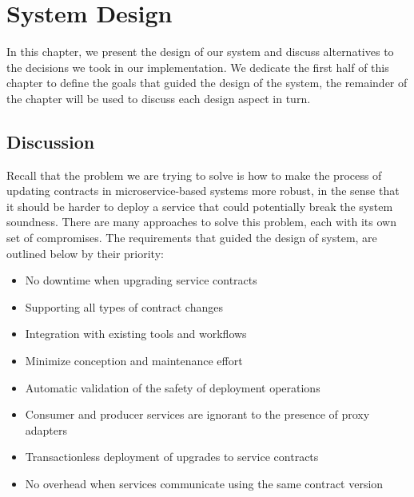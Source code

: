 
%

\chapter{System Design}
\label{cha:design}

In this chapter, we present the design of our system and discuss alternatives to the decisions we took in our implementation.
We dedicate the first half of this chapter to define the goals that guided the design of the system,
the remainder of the chapter will be used to discuss each design aspect in turn.

\section{Discussion} %
\label{sec:discussion}

Recall that the problem we are trying to solve is how to make the process of updating contracts in
microservice-based systems more robust, in the sense that it should be harder to deploy a service that could
potentially break the system soundness.
There are many approaches to solve this problem, each with its own set of compromises.
The requirements that guided the design of system, are outlined below by their priority:

\begin{itemize}
    \item No downtime when upgrading service contracts
    \item Supporting all types of contract changes
    \item Integration with existing tools and workflows
    \item Minimize conception and maintenance effort
    \item Automatic validation of the safety of deployment operations
    \item Consumer and producer services are ignorant to the presence of proxy adapters
    \item Transactionless deployment of upgrades to service contracts
    \item No overhead when services communicate using the same contract version
\end{itemize}

